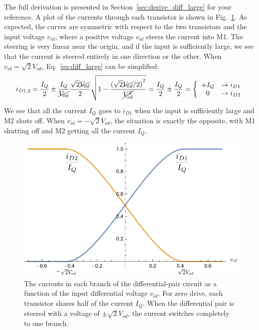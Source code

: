 %
The full derivation is presented in Section~\ref{sec:derive_diff_large} for your reference.  A plot of the currents through each transistor is shown in Fig.~\ref{fig:mosdiffamp_id}.  As expected, the curves are symmetric with respect to the two transistors and the input voltage $v_{id}$, where a positive voltage $v_{id}$ steers the current into M1.  The steering is very linear near the origin, and if the input is sufficiently large, we see that the current is steered entirely in one direction or the other.  When $v_{id} = \sqrt{2} V_{od}$, Eq.~\ref{eq:diff_large} can be simplified:
\begin{equation} 
	{i_{D1,2}} = \frac{I_Q}{2} \pm \frac{I_Q}{{{\cancel{V_{od}}}}}\frac{{{\sqrt{2} \cancel{V_{od}}}}}{2}
	\sqrt {1 - \frac{{{{({\sqrt{2}\cancel{V_{od}}}/2)}^2}}}{{\cancel{V_{od}^2}}}} 
	= \frac{I_Q}{2} \pm \frac{I_Q}{2} = \left\{ \begin{array}{cc} +I_Q &  \to i_{D1} \\ 0 & \to i_{D2} \end{array} \right.
\end{equation}
%
We see that all the current $I_Q$ goes to $i_{D1}$ when the input is sufficiently large and M2 shuts off.  When $v_{id} = - \sqrt{2} V_{od}$, the situation is exactly the opposite, with M1 shutting off and M2 getting all the current $I_Q$.


\begin{figure}[tb]
\begin{center}
\includegraphics[width=.7\columnwidth]{mosdiffamp_id}
\end{center}
\caption{The currents in each branch of the differential-pair circuit as a function of the input differential voltage $v_{id}$.  For zero drive, each transistor shares half of the current $I_Q$.  When the differential pair is steered with a voltage of $\pm \sqrt{2} V_{od}$, the current switches completely to one branch.} \label{fig:mosdiffamp_id}
\end{figure}

